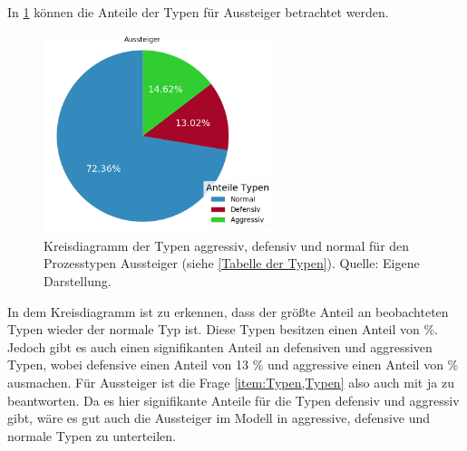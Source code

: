 In \figurename \ref{fig:AnteileTypenAussteiger} können die Anteile der Typen für Aussteiger betrachtet werden. 
\begin{figure}[H]
	\centering
		\includegraphics[width=0.6\textwidth]{pictures/data_evaluation/types/proportions_Aussteiger.png}
	\caption{Kreisdiagramm der Typen aggressiv, defensiv und normal für den Prozesstypen Aussteiger (siehe \ref{Tabelle der Typen}). Quelle: Eigene Darstellung.}
	\label{fig:AnteileTypenAussteiger}
\end{figure}
In dem Kreisdiagramm ist zu erkennen, dass der größte Anteil an beobachteten Typen wieder der normale Typ ist. Diese Typen besitzen einen Anteil von  \%. Jedoch gibt es auch einen signifikanten Anteil an defensiven und aggressiven Typen, wobei defensive einen Anteil von 13 \% und aggressive einen Anteil von  \% ausmachen. Für Aussteiger ist die Frage \ref{item:Typen,Typen} also auch mit ja zu beantworten. Da es hier signifikante Anteile für die Typen defensiv und aggressiv gibt, wäre es gut auch die Aussteiger im Modell in aggressive, defensive und normale Typen zu unterteilen.

